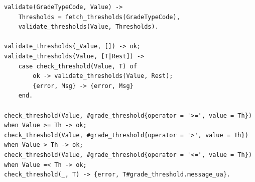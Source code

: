 \documentclass{article}
\begin{document}
\begin{appendix}
\begin{verbatim}
validate(GradeTypeCode, Value) ->
    Thresholds = fetch_thresholds(GradeTypeCode),
    validate_thresholds(Value, Thresholds).

validate_thresholds(_Value, []) -> ok;
validate_thresholds(Value, [T|Rest]) ->
    case check_threshold(Value, T) of
        ok -> validate_thresholds(Value, Rest);
        {error, Msg} -> {error, Msg}
    end.

check_threshold(Value, #grade_threshold{operator = '>=', value = Th}) when Value >= Th -> ok;
check_threshold(Value, #grade_threshold{operator = '>', value = Th}) when Value > Th -> ok;
check_threshold(Value, #grade_threshold{operator = '<=', value = Th}) when Value =< Th -> ok;
check_threshold(_, T) -> {error, T#grade_threshold.message_ua}.
\end{verbatim}

\end{appendix}
\end{document}
